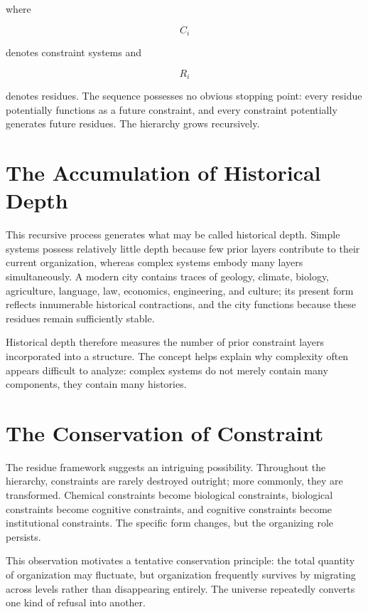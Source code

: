 \documentclass[11pt,oneside]{book}
\theoremstyle{plain}
\theoremstyle{definition}
\theoremstyle{remark}
\begin{document}
where

\begin{equation}
C_i
\end{equation}

denotes constraint systems and

\begin{equation}
R_i
\end{equation}

denotes residues. The sequence possesses no obvious stopping point: every residue potentially functions as a future constraint, and every constraint potentially generates future residues. The hierarchy grows recursively.

\section{The Accumulation of Historical Depth}

This recursive process generates what may be called historical depth. Simple systems possess relatively little depth because few prior layers contribute to their current organization, whereas complex systems embody many layers simultaneously. A modern city contains traces of geology, climate, biology, agriculture, language, law, economics, engineering, and culture; its present form reflects innumerable historical contractions, and the city functions because these residues remain sufficiently stable.

Historical depth therefore measures the number of prior constraint layers incorporated into a structure. The concept helps explain why complexity often appears difficult to analyze: complex systems do not merely contain many components, they contain many histories.

\section{The Conservation of Constraint}

The residue framework suggests an intriguing possibility. Throughout the hierarchy, constraints are rarely destroyed outright; more commonly, they are transformed. Chemical constraints become biological constraints, biological constraints become cognitive constraints, and cognitive constraints become institutional constraints. The specific form changes, but the organizing role persists.

This observation motivates a tentative conservation principle: the total quantity of organization may fluctuate, but organization frequently survives by migrating across levels rather than disappearing entirely. The universe repeatedly converts one kind of refusal into another.
\end{document}
